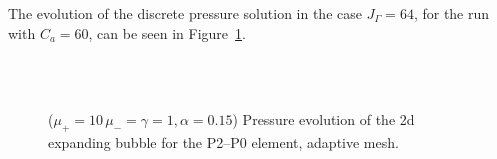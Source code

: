 The evolution of the discrete pressure solution in the case $J_\Gamma = 64$, for
the run with $C_a=60$\textdegree, can be seen in
Figure~\ref{fig:expanding_bubble_adaptive}.
\begin{figure}[htbp]
\centering
{}\\
\\
\caption[Stokes expanding bubble pressure adaptive mesh]
{($\mu_+ = 10\,\mu_- = \gamma = 1,\alpha = 0.15$) Pressure evolution of
the 2d expanding bubble for the P2--P0 element, adaptive mesh.}
\label{fig:expanding_bubble_adaptive}
\end{figure}

